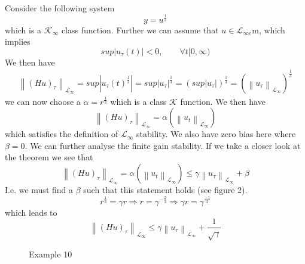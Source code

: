 \documentclass{article}
\begin{document}
\begin{frm-ex}
	Consider the following system
	$$ 
		y = u^{\frac{1}{3}}
	$$ 
	which is a $\mathcal{K}_\infty $ class function. Further we can assume that $u \in  \mathcal{L}_{\infty  e}$m, which implies\
	\begin{equation*}
		sup \left| u_\tau (t) \right| < 0, \qquad \forall t [0, \infty )
	\end{equation*} 
	We then have
	\begin{equation*}
		\begin{split}
			\left\| (Hu)_\tau \right\|_{\mathcal{L}_\infty } = sup \left| u_\tau(t)^\frac{1}{3} \right|  = sup \left| u_\tau  \right|^\frac{1}{3}
			 = (sup \left| u_\tau  \right| )^\frac{1}{3} = (\left\| u_\tau  \right\|_{\mathcal{L}_\infty })^\frac{1}{3}
		\end{split}
	\end{equation*}
	we can now choose a $\alpha = r^{\frac{1}{3}}$ which is a class $\mathcal{K}$ function. We then have
	\begin{equation*}
		\left\| (Hu)_\tau  \right\|_{\mathcal{L}_\infty } = \alpha (\left\| u_t \right\|_{\mathcal{L}_\infty }) 
	\end{equation*}
	which satisfies the definition of $\mathcal{L}_\infty $ stability. We also have zero bias here where $\beta = 0$. We can further analyse the finite gain stability. If we take a closer look at the theorem we see that
	\begin{equation*}
		\left\| (Hu)_\tau
		\right\|_{\mathcal{L}_\infty } = \alpha (\left\| u_t \right\|_{\mathcal{L}_\infty })  \leq \gamma \left\| u_\tau  \right\|_{\mathcal{L}_\infty } + \beta
	\end{equation*}
	I.e. we must find a $\beta$ such that this statement holds (see figure 2).
	\begin{equation*}
		r^{\frac{1}{3}} = \gamma r \Rightarrow r = \gamma ^{-\frac{2}{3}} \Rightarrow \gamma r= \gamma^\frac{-1}{2}
	\end{equation*}
	which leads to
	\begin{equation*}
		\left\| (Hu)_\tau  \right\| _{\mathcal{L}_\infty } \leq \gamma \left\| u_\tau  \right\|_{\mathcal{L}_\infty} + \frac{1}{\sqrt{\gamma}}
	\end{equation*}
\end{frm-ex}

\begin{figure}
	\centering
	\resizebox{0.45\textwidth}{!}{}
	\caption[short]{Example 10}
\end{figure}
\end{document}
